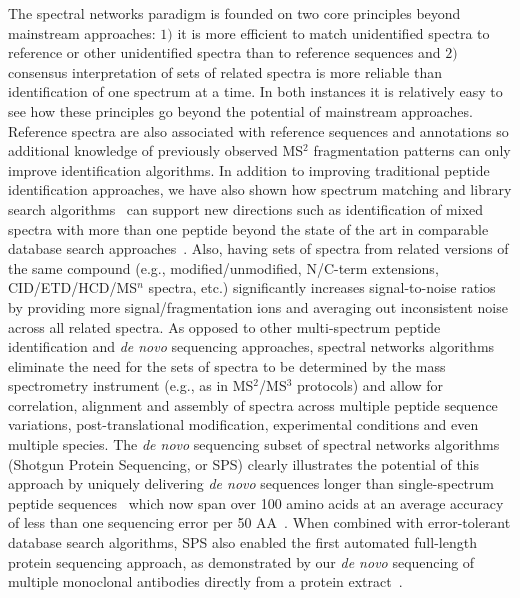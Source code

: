 \documentclass[8.5pt,twoside,twocolumn]{article}
\begin{document}
The spectral networks paradigm is founded on two core principles beyond mainstream approaches: $1)$ it is more efficient to match unidentified spectra to reference or other unidentified spectra than to reference sequences and $2)$ consensus interpretation of sets of related spectra is more reliable than identification of one spectrum at a time. In both instances it is relatively easy to see how these principles go beyond the potential of mainstream approaches. Reference spectra are also associated with reference sequences and annotations so additional knowledge of previously observed MS$^2$ fragmentation patterns can only improve identification algorithms. In addition to improving traditional peptide identification approaches, we have also shown how spectrum matching and library search algorithms~\cite{wang10} can support new directions such as identification of mixed spectra with more than one peptide beyond the state of the art in comparable database search approaches~\cite{wang10,wang11}. Also, having sets of spectra from related versions of the same compound (e.g., modified/unmodified, N/C-term extensions, CID/ETD/HCD/MS$^n$ spectra, etc.) significantly increases signal-to-noise ratios by providing more signal/fragmentation ions and averaging out inconsistent noise across all related spectra. As opposed to other multi-spectrum peptide identification and {\em de novo} sequencing approaches, spectral networks algorithms eliminate the need for the sets of spectra to be determined by the mass spectrometry instrument (e.g., as in MS$^2$/MS$^3$ protocols) and allow for correlation, alignment and assembly of spectra across multiple peptide sequence variations, post-translational modification, experimental conditions and even multiple species. The {\em de novo} sequencing subset of spectral networks algorithms (Shotgun Protein Sequencing, or SPS) clearly illustrates the potential of this approach by uniquely delivering {\em de novo} sequences longer than single-spectrum peptide sequences~\cite{bandeira07mcp} which now span over 100 amino acids at an average accuracy of less than one sequencing error per 50 AA~\cite{guthals12}. When combined with error-tolerant database search algorithms, SPS also enabled the first automated full-length protein sequencing approach, as demonstrated by our {\em de novo} sequencing of multiple monoclonal antibodies directly from a protein extract~\cite{bandeira08}.
\end{document}
